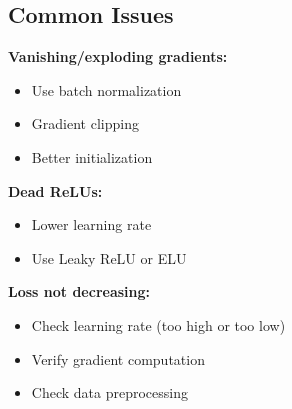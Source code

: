 \subsection{Common Issues}

\textbf{Vanishing/exploding gradients:}
\begin{itemize}
    \item Use batch normalization
    \item Gradient clipping
    \item Better initialization
\end{itemize}

\textbf{Dead ReLUs:}
\begin{itemize}
    \item Lower learning rate
    \item Use Leaky ReLU or ELU
\end{itemize}

\textbf{Loss not decreasing:}
\begin{itemize}
    \item Check learning rate (too high or too low)
    \item Verify gradient computation
    \item Check data preprocessing
\end{itemize}

